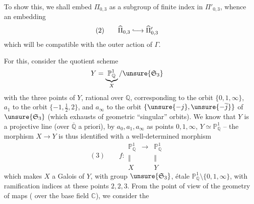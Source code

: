 To show this, we shall embed
$\Pi_{0,3}$ as a subgroup of finite index
in $\Pi'_{0,3}$, whence an  embedding
\[
(2)\qquad\widehat{\Pi}_{0,3}\lhook\joinrel\longrightarrow\widehat{\Pi}'_{0,3}
\]
which will be compatible with the outer action of $\Gamma$.


For this, consider the quotient scheme
\[
Y=\underbrace{\mathbb P^1_{\mathbb Q}}_{X}/\unsure{\mathfrak S_3}
\]
with the three points  of $Y$, rational over
$\mathbb Q$,  corresponding to the orbit
 $\{0,1,\infty\}$, $a_1$ to the orbit
$\{-1,\frac12,2\}$, and $a_\infty$ to the orbit
$\{\unsure{-j},\unsure{-\overline j}\}$ of $\unsure{\mathfrak S_3}$
(which exhausts  of geometric
``singular'' orbits). We know that $Y$ is a projective line
(over $\overline{\mathbb Q}$ a priori),   by
$a_0,a_1,a_\infty$ as points $0,1,\infty$, 
$Y\simeq\mathbb P^1_{\mathbb Q}$ -- the  morphism
$X\longrightarrow Y$ is thus identified with a well-determined morphism
\[
(3)\qquad
f:\begin{array}{ccc}
\mathbb P^1_{\mathbb Q}&\longrightarrow&\mathbb P^1_{\mathbb Q}\\
\Vert&&\Vert\\
X&&Y
\end{array}
\]
which makes $X$ a Galois  of $Y$, with group
$\unsure{\mathfrak S_3}$, étale 
$\mathbb P^1_{\mathbb Q}\setminus\{0,1,\infty\}$, with ramification
indices at these points $2,2,3$. From the point of view of the geometry of maps
( over the base field $\mathbb C$), we consider the


